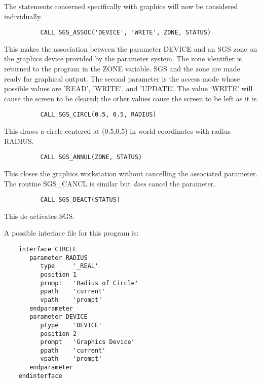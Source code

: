 The statements concerned specifically with graphics will now be considered
individually.

\begin{small}
\begin{verbatim}
          CALL SGS_ASSOC('DEVICE', 'WRITE', ZONE, STATUS)
\end{verbatim}
\end{small}

This makes the association between the parameter DEVICE and an SGS zone on the
graphics device provided by the parameter system.
The zone identifier is returned to the program in the ZONE variable.
SGS and the zone are made ready for graphical output.
The second parameter is the access mode whose possible values are 'READ',
'WRITE', and 'UPDATE'.
The value `WRITE' will cause the screen to be cleared; the other values
cause the screen to be left as it is.

\begin{small}
\begin{verbatim}
          CALL SGS_CIRCL(0.5, 0.5, RADIUS)
\end{verbatim}
\end{small}

This draws a circle centered at (0.5,0.5) in world coordinates with radius
RADIUS.

\begin{small}
\begin{verbatim}
          CALL SGS_ANNUL(ZONE, STATUS)
\end{verbatim}
\end{small}

This closes the graphics workstation without cancelling the associated
parameter. The routine SGS\_CANCL is similar but {\em does}
cancel the parameter.

\begin{small}
\begin{verbatim}
          CALL SGS_DEACT(STATUS)
\end{verbatim}
\end{small}

This de-activates SGS.

A possible interface file for this program is:

\begin{small}
\begin{verbatim}
    interface CIRCLE
       parameter RADIUS
          type     '_REAL'
          position 1
          prompt   'Radius of Circle'
          ppath    'current'
          vpath    'prompt'
       endparameter
       parameter DEVICE
          ptype    'DEVICE'
          position 2
          prompt   'Graphics Device'
          ppath    'current'
          vpath    'prompt'
       endparameter
    endinterface
\end{verbatim}
\end{small}

